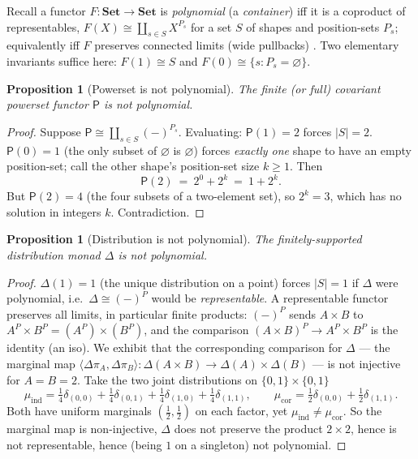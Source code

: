 \documentclass[11pt]{article}
\newtheorem{proposition}[theorem]{Proposition}
\theoremstyle{definition}
\newcommand{\Set}{\mathbf{Set}}
\newcommand{\Pow}{\mathsf{P}}
\newcommand{\Dist}{\Delta}
\begin{document}
Recall a functor $F\colon\Set\to\Set$ is \emph{polynomial} (a \emph{container}) iff
it is a coproduct of representables, $F(X)\cong\coprod_{s\in S}X^{P_s}$ for a set $S$
of shapes and position-sets $P_s$; equivalently iff $F$ preserves connected limits
(wide pullbacks) \cite{aag,gambinokock}. Two elementary invariants suffice here:
$F(1)\cong S$ and $F(0)\cong\{s:P_s=\varnothing\}$.

\begin{proposition}[Powerset is not polynomial]\label{prop:Pow}
The finite (or full) covariant powerset functor $\Pow$ is not polynomial.
\end{proposition}

\begin{proof}
Suppose $\Pow\cong\coprod_{s\in S}(-)^{P_s}$. Evaluating: $\Pow(1)=2$ forces
$|S|=2$. $\Pow(0)=1$ (the only subset of $\varnothing$ is $\varnothing$) forces
\emph{exactly one} shape to have an empty position-set; call the other shape's
position-set size $k\ge1$. Then
\[
   \Pow(2)\ =\ 2^{0}+2^{k}\ =\ 1+2^{k}.
\]
But $\Pow(2)=4$ (the four subsets of a two-element set), so $2^{k}=3$, which has no
solution in integers $k$. Contradiction.
\end{proof}

\begin{proposition}[Distribution is not polynomial]\label{prop:Dist}
The finitely-supported distribution monad $\Dist$ is not polynomial.
\end{proposition}

\begin{proof}
$\Dist(1)=1$ (the unique distribution on a point) forces $|S|=1$ if $\Dist$ were
polynomial, i.e.\ $\Dist\cong(-)^{P}$ would be \emph{representable}. A representable
functor preserves all limits, in particular finite products:
$(-)^P$ sends $A\times B$ to $A^P\times B^P=(A^P)\times(B^P)$, and the comparison
$(A\times B)^P\to A^P\times B^P$ is the identity (an iso). We exhibit that the
corresponding comparison for $\Dist$ --- the marginal map
$\langle\Dist\pi_A,\Dist\pi_B\rangle\colon\Dist(A\times B)\to\Dist(A)\times\Dist(B)$
--- is not injective for $A=B=2$. Take the two joint distributions on
$\{0,1\}\times\{0,1\}$
\[
   \mu_{\mathrm{ind}}=\tfrac14\delta_{(0,0)}+\tfrac14\delta_{(0,1)}
     +\tfrac14\delta_{(1,0)}+\tfrac14\delta_{(1,1)},\qquad
   \mu_{\mathrm{cor}}=\tfrac12\delta_{(0,0)}+\tfrac12\delta_{(1,1)} .
\]
Both have uniform marginals $(\tfrac12,\tfrac12)$ on each factor, yet
$\mu_{\mathrm{ind}}\neq\mu_{\mathrm{cor}}$. So the marginal map is non-injective,
$\Dist$ does not preserve the product $2\times2$, hence is not representable, hence
(being $1$ on a singleton) not polynomial.
\end{proof}
\end{document}
